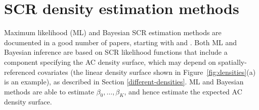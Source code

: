 \documentclass[useAMS,usenatbib,referee]{biom}
\begin{document}



\section{SCR density estimation methods} \label{secrmethods}

Maximum likelihood (ML) and Bayesian SCR estimation methods are documented in a good number of papers, starting with \cite{Borchers+Efford:08} and \cite{Royle+Young:08}. Both ML and Bayesian inference are based on SCR likelihood functions that include a component specifying the AC density surface, which may depend on spatially-referenced covariates (the linear density surface shown in Figure~\ref{fig:densities}(a) is an example), as described in Section \ref{different-densities}. ML and Bayesian methods are able to estimate $\beta_0,\ldots,\beta_K$, and hence estimate the expected AC density surface. 
\end{document}
